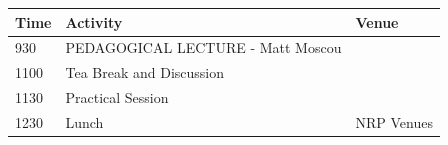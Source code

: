 \documentclass[12pt,]{book}
\theoremstyle{definition}
\theoremstyle{definition}
\theoremstyle{remark}
\begin{document}
\begin{longtable}[]{@{}lll@{}}
\toprule
\begin{minipage}[b]{0.09\columnwidth}\raggedright\strut
Time\strut
\end{minipage} & \begin{minipage}[b]{0.38\columnwidth}\raggedright\strut
Activity\strut
\end{minipage} & \begin{minipage}[b]{0.13\columnwidth}\raggedright\strut
Venue\strut
\end{minipage}\tabularnewline
\midrule
\endhead
\begin{minipage}[t]{0.09\columnwidth}\raggedright\strut
930\strut
\end{minipage} & \begin{minipage}[t]{0.38\columnwidth}\raggedright\strut
PEDAGOGICAL LECTURE - Matt Moscou\strut
\end{minipage} & \begin{minipage}[t]{0.13\columnwidth}\raggedright\strut
\strut
\end{minipage}\tabularnewline
\begin{minipage}[t]{0.09\columnwidth}\raggedright\strut
1100\strut
\end{minipage} & \begin{minipage}[t]{0.38\columnwidth}\raggedright\strut
Tea Break and Discussion\strut
\end{minipage} & \begin{minipage}[t]{0.13\columnwidth}\raggedright\strut
\strut
\end{minipage}\tabularnewline
\begin{minipage}[t]{0.09\columnwidth}\raggedright\strut
1130\strut
\end{minipage} & \begin{minipage}[t]{0.38\columnwidth}\raggedright\strut
Practical Session\strut
\end{minipage} & \begin{minipage}[t]{0.13\columnwidth}\raggedright\strut
\strut
\end{minipage}\tabularnewline
\begin{minipage}[t]{0.09\columnwidth}\raggedright\strut
1230\strut
\end{minipage} & \begin{minipage}[t]{0.38\columnwidth}\raggedright\strut
Lunch\strut
\end{minipage} & \begin{minipage}[t]{0.13\columnwidth}\raggedright\strut
NRP Venues\strut

\end{minipage}
\end{longtable}
\end{document}
